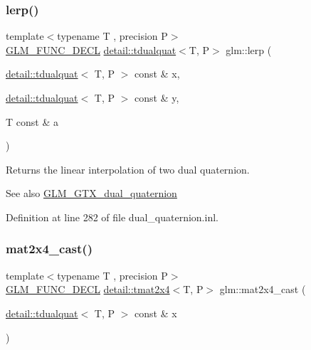 \subsubsection{\texorpdfstring{lerp()}{lerp()}}
{\footnotesize\ttfamily template$<$typename T , precision P$>$ \\
\hyperlink{setup_8hpp_ab2d052de21a70539923e9bcbf6e83a51}{G\+L\+M\+\_\+\+F\+U\+N\+C\+\_\+\+D\+E\+CL} \hyperlink{structglm_1_1detail_1_1tdualquat}{detail\+::tdualquat}$<$T, P$>$ glm\+::lerp (\begin{DoxyParamCaption}\item[{\hyperlink{structglm_1_1detail_1_1tdualquat}{detail\+::tdualquat}$<$ T, P $>$ const \&}]{x,  }\item[{\hyperlink{structglm_1_1detail_1_1tdualquat}{detail\+::tdualquat}$<$ T, P $>$ const \&}]{y,  }\item[{T const \&}]{a }\end{DoxyParamCaption})}

Returns the linear interpolation of two dual quaternion.

\begin{DoxySeeAlso}{See also}
\hyperlink{group__gtc__dual__quaternion}{G\+L\+M\+\_\+\+G\+T\+X\+\_\+dual\+\_\+quaternion} 
\end{DoxySeeAlso}


Definition at line 282 of file dual\+\_\+quaternion.\+inl.

\mbox{\label{group__gtc__dual__quaternion_gade155fb0dfc144259a25897776e73325}} 
\subsubsection{\texorpdfstring{mat2x4\+\_\+cast()}{mat2x4\_cast()}}
{\footnotesize\ttfamily template$<$typename T , precision P$>$ \\
\hyperlink{setup_8hpp_ab2d052de21a70539923e9bcbf6e83a51}{G\+L\+M\+\_\+\+F\+U\+N\+C\+\_\+\+D\+E\+CL} \hyperlink{structglm_1_1detail_1_1tmat2x4}{detail\+::tmat2x4}$<$T, P$>$ glm\+::mat2x4\+\_\+cast (\begin{DoxyParamCaption}\item[{\hyperlink{structglm_1_1detail_1_1tdualquat}{detail\+::tdualquat}$<$ T, P $>$ const \&}]{x }\end{DoxyParamCaption})}

